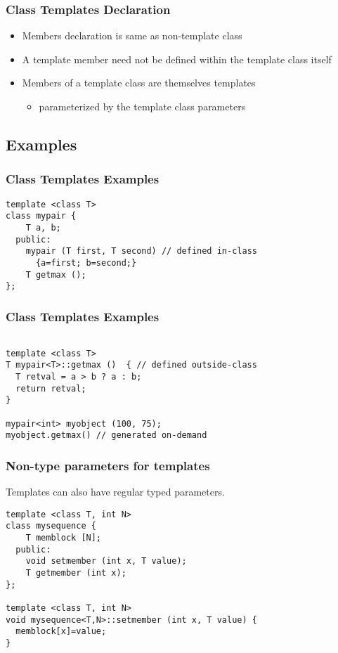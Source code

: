 \documentclass{beamer}
\begin{document}
\begin{frame}
\frametitle{Class Templates Declaration}

\begin{itemize}
\item Members declaration is same as non-template class
\item A template member need not be defined within the template class itself
\item Members of a template class are themselves templates
    \begin{itemize} 
    \item parameterized by the template class parameters
    \end{itemize}
\end{itemize}
\end{frame}

\subsection{Examples}

\begin{frame}[fragile]
\frametitle{Class Templates Examples}
\begin{lstlisting}
template <class T>
class mypair {
    T a, b;
  public:
    mypair (T first, T second) // defined in-class
      {a=first; b=second;}
    T getmax ();
};

\end{lstlisting}

\end{frame}

\begin{frame}[fragile]
\frametitle{Class Templates Examples}
\begin{lstlisting}

template <class T>
T mypair<T>::getmax ()  { // defined outside-class
  T retval = a > b ? a : b;
  return retval;
}

mypair<int> myobject (100, 75);
myobject.getmax() // generated on-demand

\end{lstlisting}

\end{frame}


\begin{frame}[fragile]
\frametitle{Non-type parameters for templates}
Templates can also have regular typed parameters.
\begin{lstlisting}
template <class T, int N>
class mysequence {
    T memblock [N];
  public:
    void setmember (int x, T value);
    T getmember (int x);
};

template <class T, int N>
void mysequence<T,N>::setmember (int x, T value) {
  memblock[x]=value;
}

\end{lstlisting}
\end{frame}
\end{document}
